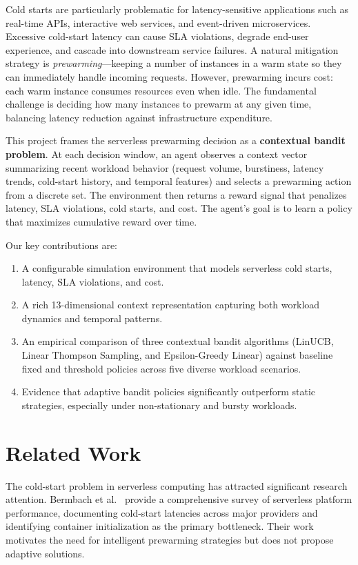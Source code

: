 \documentclass[11pt]{article}
\begin{document}
Cold starts are particularly problematic for latency-sensitive applications such as real-time APIs, interactive web services, and event-driven microservices. Excessive cold-start latency can cause SLA violations, degrade end-user experience, and cascade into downstream service failures. A natural mitigation strategy is \textit{prewarming}---keeping a number of instances in a warm state so they can immediately handle incoming requests. However, prewarming incurs cost: each warm instance consumes resources even when idle. The fundamental challenge is deciding how many instances to prewarm at any given time, balancing latency reduction against infrastructure expenditure.

This project frames the serverless prewarming decision as a \textbf{contextual bandit problem}. At each decision window, an agent observes a context vector summarizing recent workload behavior (request volume, burstiness, latency trends, cold-start history, and temporal features) and selects a prewarming action from a discrete set. The environment then returns a reward signal that penalizes latency, SLA violations, cold starts, and cost. The agent's goal is to learn a policy that maximizes cumulative reward over time.

Our key contributions are:
\begin{enumerate}[nosep]
    \item A configurable simulation environment that models serverless cold starts, latency, SLA violations, and cost.
    \item A rich 13-dimensional context representation capturing both workload dynamics and temporal patterns.
    \item An empirical comparison of three contextual bandit algorithms (LinUCB, Linear Thompson Sampling, and Epsilon-Greedy Linear) against baseline fixed and threshold policies across five diverse workload scenarios.
    \item Evidence that adaptive bandit policies significantly outperform static strategies, especially under non-stationary and bursty workloads.
\end{enumerate}

\section{Related Work}

The cold-start problem in serverless computing has attracted significant research attention. Bermbach et al.~\cite{bermbach2020} provide a comprehensive survey of serverless platform performance, documenting cold-start latencies across major providers and identifying container initialization as the primary bottleneck. Their work motivates the need for intelligent prewarming strategies but does not propose adaptive solutions.
\end{document}
